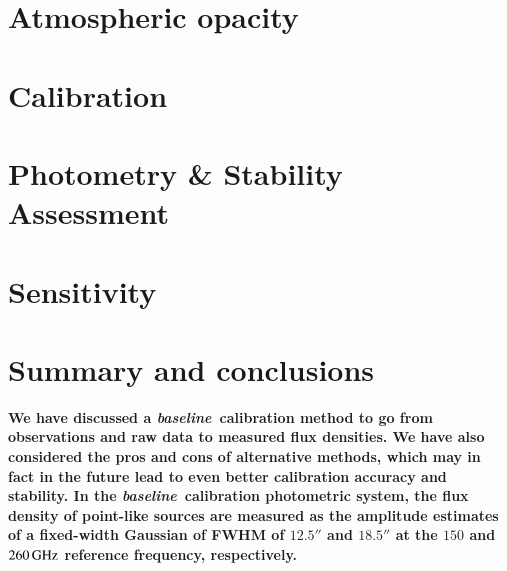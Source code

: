 \documentclass[traditionalabstract]{aa}
\newcommand{\baseline}{\emph{baseline}}
\newcommand{\lp}[1]{\bf \color[RGB]{230, 0, 92} #1}
\begin{document}
\section{Atmospheric opacity}
\label{se:opacity}


\section{Calibration}
\label{se:calibration}



\section{Photometry \& Stability Assessment}
\label{se:photometry}


\section{Sensitivity}
\label{se:sensitivity}



\section{Summary and conclusions}
\label{se:summary}


{\lp We have discussed a \baseline\ calibration method to go from
observations and raw data to measured flux densities. We have also
considered the pros and cons of alternative methods, which may in fact
in the future lead to even better calibration accuracy and stability.
In the \baseline\ calibration photometric system, the flux
density of point-like sources are measured as the amplitude estimates
of a fixed-width Gaussian of FWHM of $12.5''$ and $18.5''$ at the
$150$ and $260\,\rm{GHz}$ reference frequency, respectively.}
\end{document}
